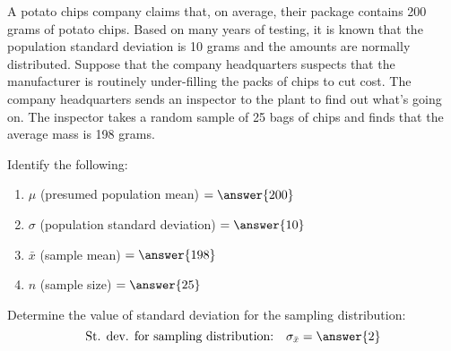 \documentclass{ximera}
\begin{document}
\begin{problem}\label{pr:chips}
A potato chips company claims that, on average, their package contains 200 grams of potato chips. Based on many years of testing, it is known that the population standard deviation is 10 grams and the amounts are normally distributed. Suppose that the company headquarters suspects that the manufacturer is routinely under-filling the packs of chips to cut cost. The company headquarters sends an inspector to the plant to find out what’s going on. The inspector takes a random sample of 25 bags of chips and finds that the average mass is 198 grams. 

\begin{question} 
Identify the following:
\begin{enumerate}
    \item $\mu$ (presumed population mean) $= \answer{200}$
    \item $\sigma$ (population standard deviation) $= \answer{10}$
    \item $\bar{x}$ (sample mean) $=\answer{198}$
    \item $n$ (sample size) $= \answer{25}$
\end{enumerate}
\end{question}

\begin{question}
Determine the value of standard deviation for the sampling distribution:
$$\mbox{St. dev. for sampling distribution:}\quad\sigma_{\bar{x}}= \answer{2}$$
\end{question}


\end{problem}
\end{document}

